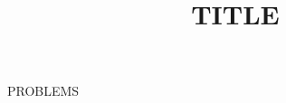 \documentclass[12pt,letterpaper]{coursedoc}
\title{TITLE}
\begin{document}
\maketitle

PROBLEMS
\end{document}
